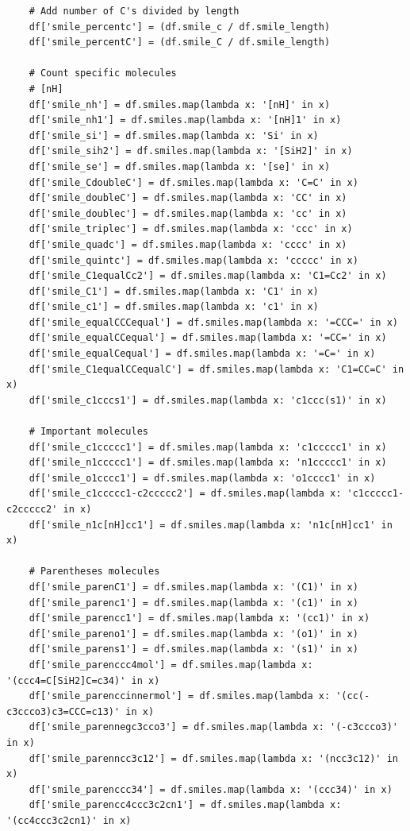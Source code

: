 \documentclass[]{article}
\begin{document}
\begin{flushleft}
\begin{lstlisting}
    # Add number of C's divided by length
    df['smile_percentc'] = (df.smile_c / df.smile_length)
    df['smile_percentC'] = (df.smile_C / df.smile_length)

    # Count specific molecules
    # [nH]
    df['smile_nh'] = df.smiles.map(lambda x: '[nH]' in x)
    df['smile_nh1'] = df.smiles.map(lambda x: '[nH]1' in x)
    df['smile_si'] = df.smiles.map(lambda x: 'Si' in x)
    df['smile_sih2'] = df.smiles.map(lambda x: '[SiH2]' in x)
    df['smile_se'] = df.smiles.map(lambda x: '[se]' in x)
    df['smile_CdoubleC'] = df.smiles.map(lambda x: 'C=C' in x)
    df['smile_doubleC'] = df.smiles.map(lambda x: 'CC' in x)
    df['smile_doublec'] = df.smiles.map(lambda x: 'cc' in x)
    df['smile_triplec'] = df.smiles.map(lambda x: 'ccc' in x)
    df['smile_quadc'] = df.smiles.map(lambda x: 'cccc' in x)
    df['smile_quintc'] = df.smiles.map(lambda x: 'ccccc' in x)
    df['smile_C1equalCc2'] = df.smiles.map(lambda x: 'C1=Cc2' in x)
    df['smile_C1'] = df.smiles.map(lambda x: 'C1' in x)
    df['smile_c1'] = df.smiles.map(lambda x: 'c1' in x)
    df['smile_equalCCCequal'] = df.smiles.map(lambda x: '=CCC=' in x)
    df['smile_equalCCequal'] = df.smiles.map(lambda x: '=CC=' in x)
    df['smile_equalCequal'] = df.smiles.map(lambda x: '=C=' in x)
    df['smile_C1equalCCequalC'] = df.smiles.map(lambda x: 'C1=CC=C' in x)
    df['smile_c1cccs1'] = df.smiles.map(lambda x: 'c1ccc(s1)' in x)

    # Important molecules
    df['smile_c1ccccc1'] = df.smiles.map(lambda x: 'c1ccccc1' in x)
    df['smile_n1ccccc1'] = df.smiles.map(lambda x: 'n1ccccc1' in x)
    df['smile_o1cccc1'] = df.smiles.map(lambda x: 'o1cccc1' in x)
    df['smile_c1ccccc1-c2ccccc2'] = df.smiles.map(lambda x: 'c1ccccc1-c2ccccc2' in x)
    df['smile_n1c[nH]cc1'] = df.smiles.map(lambda x: 'n1c[nH]cc1' in x)
    
    # Parentheses molecules
    df['smile_parenC1'] = df.smiles.map(lambda x: '(C1)' in x)
    df['smile_parenc1'] = df.smiles.map(lambda x: '(c1)' in x)
    df['smile_parencc1'] = df.smiles.map(lambda x: '(cc1)' in x)
    df['smile_pareno1'] = df.smiles.map(lambda x: '(o1)' in x)
    df['smile_parens1'] = df.smiles.map(lambda x: '(s1)' in x)
    df['smile_parenccc4mol'] = df.smiles.map(lambda x: '(ccc4=C[SiH2]C=c34)' in x)
    df['smile_parenccinnermol'] = df.smiles.map(lambda x: '(cc(-c3ccco3)c3=CCC=c13)' in x)
    df['smile_parennegc3cco3'] = df.smiles.map(lambda x: '(-c3ccco3)' in x)
    df['smile_parenncc3c12'] = df.smiles.map(lambda x: '(ncc3c12)' in x)
    df['smile_parenccc34'] = df.smiles.map(lambda x: '(ccc34)' in x)
    df['smile_parencc4ccc3c2cn1'] = df.smiles.map(lambda x: '(cc4ccc3c2cn1)' in x)


\end{lstlisting}
\end{flushleft}
\end{document}
